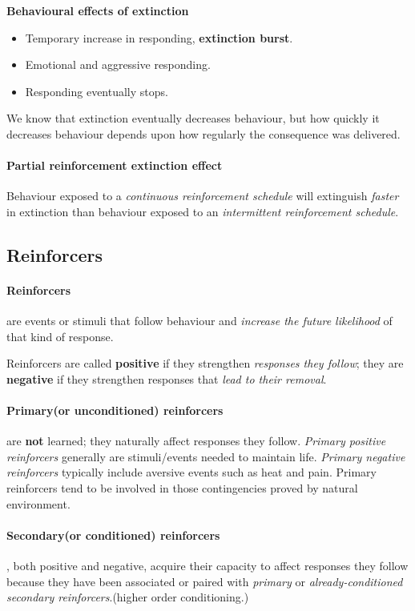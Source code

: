\documentclass{article}
\begin{document}
	\textbf{Behavioural effects of extinction}
	\begin{itemize}
		\item Temporary increase in responding, \textbf{extinction burst}.
		\item Emotional and aggressive responding.
		\item Responding eventually stops.
	\end{itemize}
	
	We know that extinction eventually decreases behaviour, but how quickly it decreases behaviour depends upon how regularly the consequence was delivered.
	\paragraph{Partial reinforcement extinction effect} Behaviour exposed to a \emph{continuous reinforcement schedule} will extinguish \emph{faster} in extinction than behaviour exposed to an \emph{intermittent reinforcement schedule}.
	\subsection{Reinforcers}
	\paragraph{Reinforcers} are events or stimuli that follow behaviour and \emph{increase the future likelihood} of that kind of response.
	
	Reinforcers are called \textbf{positive} if they strengthen \emph{responses they follow}; they are \textbf{negative} if they strengthen responses that \emph{lead to their removal}.
	
	\paragraph{Primary(or unconditioned) reinforcers} are \textbf{not} learned; they naturally affect responses they follow. \emph{Primary positive reinforcers} generally are stimuli/events needed to maintain life. \emph{Primary negative reinforcers} typically include aversive events such as heat and pain. Primary reinforcers tend to be involved in those contingencies proved by natural environment.
	
	\paragraph{Secondary(or conditioned) reinforcers}, both positive and negative, acquire their capacity to affect responses they follow because they have been associated or paired with \emph{primary} or \emph{already-conditioned secondary reinforcers}.(higher order conditioning.)
	
\end{document}
